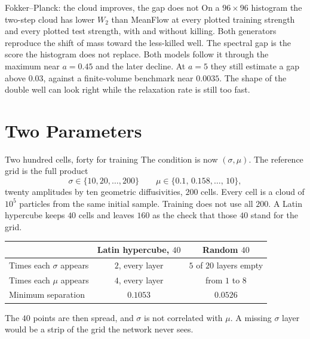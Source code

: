 \documentclass[aspectratio=169,11pt,t]{beamer}
\newcommand{\sectime}{}
\begin{document}
\begin{frame}{Fokker--Planck: the cloud improves, the gap does not}
  On a $96\times 96$ histogram the two-step cloud has lower $W_2$ than MeanFlow at every plotted training strength and every plotted test strength, with and without killing.
  Both generators reproduce the shift of mass toward the less-killed well.
  \vspace{0.45em}
  The spectral gap is the score the histogram does not replace.
  Both models follow it through the maximum near $a=0.45$ and the later decline.
  At $a=5$ they still estimate a gap above $0.03$, against a finite-volume benchmark near $0.0035$.
  \vspace{0.4em}
  The shape of the double well can look right while the relaxation rate is still too fast.
\end{frame}


\renewcommand{\sectime}{About five minutes}
\section[Two Parameters]{Two Parameters}

\begin{frame}{Two hundred cells, forty for training}
  The condition is now $(\sigma,\mu)$.
  The reference grid is the full product
  \[
    \sigma\in\{10,20,\ldots,200\}
    \qquad
    \mu\in\{0.1,\,0.158,\ldots,\,10\},
  \]
  twenty amplitudes by ten geometric diffusivities, $200$ cells.
  Every cell is a cloud of $10^5$ particles from the same initial sample.
  \vspace{0.35em}
  Training does not use all $200$.
  A Latin hypercube keeps $40$ cells and leaves $160$ as the check that those $40$ stand for the grid.
  \vspace{0.25em}
  \small
  \begin{tabular}{@{}lcc@{}}
    \toprule
     & Latin hypercube, $40$ & Random $40$ \\
    \midrule
    Times each $\sigma$ appears & $2$, every layer & $5$ of $20$ layers empty \\
    Times each $\mu$ appears & $4$, every layer & from $1$ to $8$ \\
    Minimum separation & $0.1053$ & $0.0526$ \\
    \bottomrule
  \end{tabular}
  \vspace{0.3em}
  \normalsize
  The $40$ points are then spread, and $\sigma$ is not correlated with $\mu$.
  A missing $\sigma$ layer would be a strip of the grid the network never sees.
\end{frame}
\end{document}
